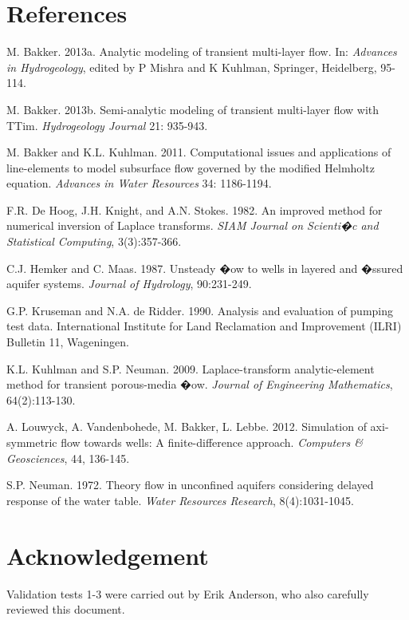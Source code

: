 \documentclass [10pt,letterpaper] {article}
\begin{document}
\section{References}
\begin{description}
\item M. Bakker. 2013a. Analytic modeling of transient multi-layer flow. In: {\it Advances in Hydrogeology}, edited by P Mishra and K Kuhlman, Springer, Heidelberg, 95-114.
\item M. Bakker. 2013b. Semi-analytic modeling of transient multi-layer flow with TTim.  {\it Hydrogeology Journal} 21: 935-943.
\item M. Bakker and K.L. Kuhlman. 2011. Computational issues and applications of line-elements to model subsurface flow governed by the modified Helmholtz equation. {\it Advances in Water Resources} 34: 1186-1194.
\item F.R. De Hoog, J.H. Knight, and A.N. Stokes. 1982. An improved method for numerical inversion of Laplace transforms. {\it SIAM Journal on Scienti�c and Statistical Computing}, 3(3):357-366. 
\item C.J. Hemker and C. Maas. 1987. Unsteady �ow to wells in layered and �ssured aquifer systems. 
{\it Journal of Hydrology}, 90:231-249.
\item G.P. Kruseman and N.A. de Ridder. 1990. Analysis and evaluation
of pumping test data. International Institute for Land Reclamation and Improvement (ILRI) Bulletin 11, Wageningen.
\item  K.L. Kuhlman and S.P. Neuman. 2009. Laplace-transform analytic-element method for transient 
porous-media �ow. {\it Journal of Engineering Mathematics}, 64(2):113-130. 
\item A. Louwyck, A. Vandenbohede, M. Bakker, L. Lebbe. 2012. Simulation of axi-symmetric flow towards wells: A finite-difference approach. {\it Computers \& Geosciences}, 44, 136-145.
\item S.P. Neuman. 1972. Theory flow in unconfined aquifers considering delayed response of the water table. {\it Water Resources Research}, 8(4):1031-1045. 

\end{description}

\section{Acknowledgement}
Validation tests 1-3 were carried out by Erik Anderson, who also carefully reviewed this document.
\end{document}
